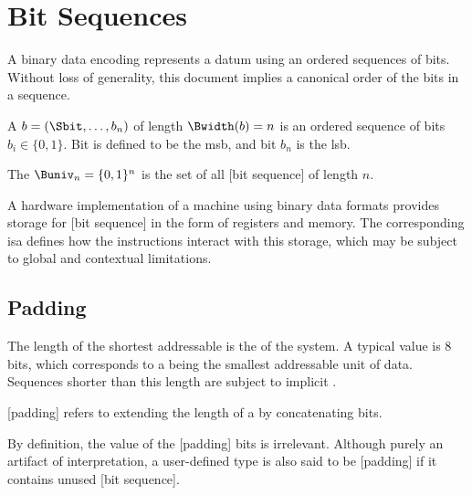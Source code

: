 \section{Bit Sequences}

A binary data encoding represents a datum using an ordered sequences of bits.
Without loss of generality, this document implies a canonical order of the bits in a sequence.

\begin{definition}
    A  \(b = (\Sbit, \ldots, b_n)\) of length \(\Bwidth(b) = n\) is an ordered sequence of bits \(b_i \in \{0, 1\}\).
    Bit \Sbit{} is defined to be the \gls{msb}, and bit \(b_n\) is the \gls{lsb}.
\end{definition}

\begin{definition}
    The  \(\Buniv_n = \{0,1\}^n\) is the set of all [bit sequence] of length \(n\).
\end{definition}

A hardware implementation of a machine using binary data formats provides storage for [bit sequence] in the form of registers and memory.
The corresponding \gls{isa} defines how the instructions interact with this storage, which may be subject to global and contextual limitations.

\subsection{Padding}

The length of the shortest addressable  is the  of the system.
A typical value is \(8\) bits, which corresponds to a  being the smallest addressable unit of data.
Sequences shorter than this length are subject to implicit .

\begin{definition}[Padding]
    [padding] refers to extending the length of a  by concatenating bits.
\end{definition}

By definition, the value of the [padding] bits is irrelevant.
Although purely an artifact of interpretation, a user-defined type is also said to be [padding] if it contains unused [bit sequence].

